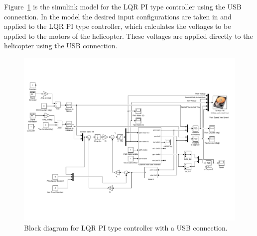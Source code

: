 Figure~\ref{fig:LQR_PI_USB_Block_Diagram} is the simulink model for the LQR PI type controller using the USB connection.  In the model the desired input configurations are taken in and applied to the LQR PI type controller, which calculates the voltages to be applied to the motors of the helicopter.  These voltages are applied directly to the helicopter using the USB connection.
\begin{figure}[!htbp]
    \centering
    \includegraphics[width=.8\textwidth,keepaspectratio=true]{figs/img/LQR_PI_USB}
    \caption{Block diagram for LQR PI type controller with a USB connection.}
    \label{fig:LQR_PI_USB_Block_Diagram}
\end{figure}

